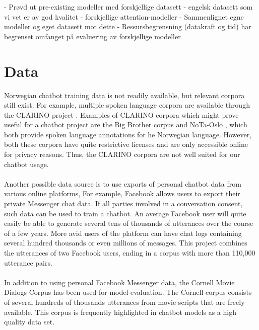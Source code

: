 \documentclass{article}
\begin{document}
\if
 - Prøvd ut pre-existing modeller med forskjellige datasett
    - engelsk datasett som vi vet er av god kvalitet
    - forskjellige attention-modeller
 - Sammenlignet egne modeller og eget datasett mot dette
 - Ressursbegrensning (datakraft og tid) har begrenset omfanget på evaluering
 av forskjellige modeller
\fi

\section{Data}

Norwegian chatbot training data is not readily available, but relevant corpora
still exist.  For example, multiple spoken language corpora are available
through the CLARINO project \cite{clarino-about}. Examples of CLARINO
corpora which might prove useful for a chatbot project are the Big Brother
corpus \cite{clarino-bb} and NoTa-Oslo \cite{clarino-nota}, which both provide
spoken language annotations for he Norwegian language. However, both these
corpora have quite restrictive licenses and are only accessible online for
privacy reasons. Thus, the CLARINO corpora are not well suited for our chatbot
usage.

\paragraph{}
Another possible data source is to use exports of personal chatbot data from
various online platforms, For example, Facebook allows users to export their
private Messenger chat data. If all parties involved in a conversation consent,
such data can be used to train a chatbot. An average Facebook user will quite
easily be able to generate several tens of thousands of utterances over the
course of a few years. More avid users of the platform can have chat logs
containing several hundred thousands or even millions of messages. This project
combines the utterances of two Facebook users, ending in a corpus with more
than 110,000 utterance pairs.


\paragraph{}
In addition to using personal Facebook Messenger data, the Cornell Movie
Dialogs Corpus \cite{cornell-corpus} has been used for model evaluation. The
Cornell corpus consists of several hundreds of thousands utterances from movie
scripts that are freely available. This corpus is frequently highlighted in
chatbot models as a high quality data set.
\end{document}
